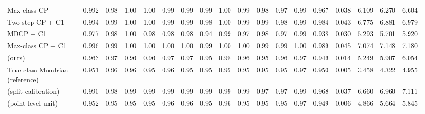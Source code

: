 \begin{table}[!htbp]
{\begin{tabular}{lccccccccccccccccc}
Max-class CP & 0.992 & 0.98 & 1.00 & 1.00 & 0.99 & 0.99 & 0.99 & 1.00 & 0.99 & 0.98 & 0.97 & 0.99 & 0.967 & 0.038 & 6.109 & 6.270 & 6.604 \\
Two-step CP + C1 & 0.994 & 0.99 & 1.00 & 1.00 & 0.99 & 0.99 & 0.98 & 1.00 & 0.99 & 0.99 & 0.98 & 0.99 & 0.984 & 0.043 & 6.775 & 6.881 & 6.979 \\
MDCP + C1 & 0.977 & 0.98 & 1.00 & 0.98 & 0.98 & 0.98 & 0.94 & 0.99 & 0.97 & 0.98 & 0.97 & 0.99 & 0.938 & 0.030 & 5.293 & 5.701 & 5.920 \\
Max-class CP + C1 & 0.996 & 0.99 & 1.00 & 1.00 & 1.00 & 1.00 & 0.99 & 1.00 & 1.00 & 0.99 & 0.99 & 1.00 & 0.989 & 0.045 & 7.074 & 7.148 & 7.180 \\
\gamut{} (ours) & 0.963 & 0.97 & 0.96 & 0.96 & 0.97 & 0.97 & 0.95 & 0.98 & 0.96 & 0.95 & 0.96 & 0.97 & 0.949 & 0.014 & 5.249 & 5.907 & 6.054 \\
True-class Mondrian (reference) & 0.951 & 0.96 & 0.96 & 0.95 & 0.96 & 0.95 & 0.95 & 0.95 & 0.95 & 0.95 & 0.95 & 0.97 & 0.950 & 0.005 & 3.458 & 4.322 & 4.955 \\
\gamut{} (split calibration) & 0.990 & 0.98 & 0.99 & 0.99 & 0.99 & 0.99 & 0.99 & 0.99 & 0.99 & 0.97 & 0.97 & 0.99 & 0.968 & 0.037 & 6.660 & 6.960 & 7.111 \\
\gamut{} (point-level unit) & 0.952 & 0.95 & 0.95 & 0.95 & 0.96 & 0.96 & 0.95 & 0.96 & 0.95 & 0.95 & 0.95 & 0.97 & 0.949 & 0.006 & 4.866 & 5.664 & 5.845 \\
\bottomrule
\end{tabular}}
\end{table}
\FloatBarrier

